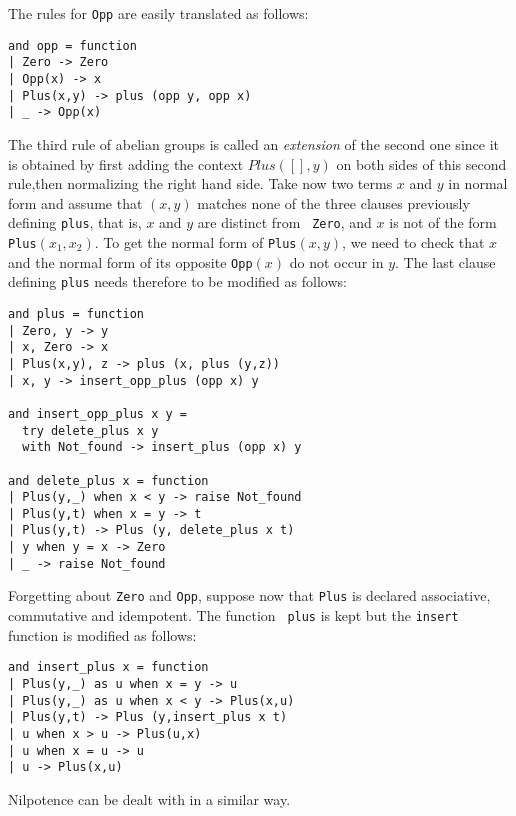 The rules for {\tt Opp} are easily translated as follows:

{\small\begin{verbatim}
and opp = function
| Zero -> Zero
| Opp(x) -> x
| Plus(x,y) -> plus (opp y, opp x)
| _ -> Opp(x)
\end{verbatim}}

The third rule of abelian groups is called an {\em extension} of the
second one since it is obtained by first adding the context
$Plus([],y)$ on both sides of this second rule,then normalizing the
right hand side. Take now two terms $x$ and $y$ in normal form and
assume that $(x,y)$ matches none of the three clauses previously
defining {\tt plus}, that is, $x$ and $y$ are distinct from {\tt
Zero}, and $x$ is not of the form {\tt Plus}$(x_1,x_2)$. To get the
normal form of {\tt Plus}$(x,y)$, we need to check that $x$ and the
normal form of its opposite {\tt Opp}$(x)$ do not occur in $y$. The
last clause defining {\tt plus} needs therefore to be modified as
follows:

{\small\begin{verbatim}
and plus = function
| Zero, y -> y
| x, Zero -> x
| Plus(x,y), z -> plus (x, plus (y,z))
| x, y -> insert_opp_plus (opp x) y

and insert_opp_plus x y =
  try delete_plus x y
  with Not_found -> insert_plus (opp x) y

and delete_plus x = function
| Plus(y,_) when x < y -> raise Not_found
| Plus(y,t) when x = y -> t
| Plus(y,t) -> Plus (y, delete_plus x t)
| y when y = x -> Zero
| _ -> raise Not_found
\end{verbatim}}

Forgetting about {\tt Zero} and {\tt Opp}, suppose now that {\tt Plus}
is declared associative, commutative and idempotent. The function {\tt
plus} is kept but the {\tt insert} function is modified as follows:

{\small\begin{verbatim}
and insert_plus x = function
| Plus(y,_) as u when x = y -> u
| Plus(y,_) as u when x < y -> Plus(x,u)
| Plus(y,t) -> Plus (y,insert_plus x t)
| u when x > u -> Plus(u,x)
| u when x = u -> u
| u -> Plus(x,u)
\end{verbatim}}

Nilpotence can be dealt with in a similar way.



